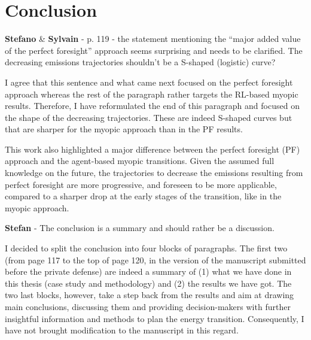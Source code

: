 \documentclass[12pt,a4paper]{article}
\begin{document}
\section{Conclusion}
\label{Conclusion}

\begin{mdframed}[style=comment] %
{\color{orange} \textbf{Stefano}} \& {\color{purple} \textbf{Sylvain}} - p. 119 -  the statement mentioning the ``major added value of the perfect foresight'' approach seems surprising and needs to be clarified.  The decreasing  emissions trajectories shouldn't be a S-shaped (logistic) curve?
\end{mdframed}

\noindent I agree that this sentence and what came next focused on the perfect foresight approach whereas the rest of the paragraph rather targets the RL-based myopic results. Therefore, I have reformulated {\color{blue}the end of this paragraph} and focused on the shape of the decreasing  trajectories. These are indeed S-shaped curves but that are sharper for the myopic approach than in the PF results.

\begin{mdframed}[style=manuscript] %
This work also highlighted a major difference between the perfect foresight (PF) approach and the agent-based myopic transitions. Given the assumed full knowledge on the future, the trajectories to decrease the  emissions resulting from perfect foresight are more progressive, and foreseen to be more applicable, compared to a sharper drop at the early stages of the transition, like in the myopic approach.
\end{mdframed}

\begin{mdframed}[style=comment] %
{\color{teal} \textbf{Stefan}} - The conclusion is a summary and should rather be a discussion.
\end{mdframed}

\noindent I decided to split the conclusion into four blocks of paragraphs. The first two (from page 117 to the top of page 120, in the version of the manuscript submitted before the private defense) are indeed a summary of (1) what we have done in this thesis (case study and methodology) and (2) the results we have got. The two last blocks, however, take a step back from the results and aim at drawing main conclusions, discussing them and providing decision-makers with further insightful information and methods to plan the energy transition. Consequently, I have not brought modification to the manuscript in this regard.

\clearpage
\def\bibfont{\scriptsize}

\normalsize
\end{document}
